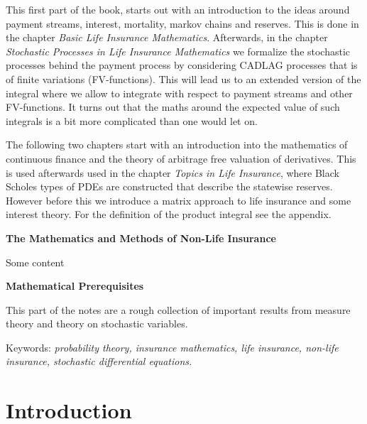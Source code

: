 \documentclass[a4paper,12pt,openany]{book}
\begin{document}
This first part of the book, starts out with an introduction to the ideas around payment streams, interest, mortality, markov chains and reserves. This is done in the chapter \emph{Basic Life Insurance Mathematics}. Afterwards, in the chapter \emph{Stochastic Processes in Life Insurance Mathematics} we formalize the stochastic processes behind the payment process by considering CADLAG processes that is of finite variations (FV-functions). This will lead us to an extended version of the integral where we allow to integrate with respect to payment streams and other FV-functions. It turns out that the maths around the expected value of such integrals is a bit more complicated than one would let on.

The following two chapters start with an introduction into the mathematics of continuous finance and the theory of arbitrage free valuation of derivatives. This is used afterwards used in the chapter \emph{Topics in Life Insurance}, where Black Scholes types of PDEs are constructed that describe the statewise reserves. However before this we introduce a matrix approach to life insurance and some interest theory. For the definition of the product integral see the appendix.

\textbf{The Mathematics and Methods of Non-Life Insurance}

Some content

\textbf{Mathematical Prerequisites}

This part of the notes are a rough collection of important results from measure theory and theory on stochastic variables.

\vspace{5pt}
\noindent Keywords: \emph{probability theory, insurance mathematics, life insurance, non-life insurance, stochastic differential equations.}

\newpage

\begin{spacing}{1}
\tableofcontents
\end{spacing}

\newpage

\setcounter{page}{1}
\pagestyle{fancy}
\fancyhf{}
\renewcommand{\headrulewidth}{0pt}
\fancyhead[LE]{\fontsize{11}{12} \selectfont\nouppercase{\thepage}}
\fancyhead[RE]{\fontsize{11}{12} \selectfont\nouppercase{\leftmark}}
\fancyhead[LO]{\fontsize{11}{12} \selectfont\nouppercase{\rightmark}}
\fancyhead[RO]{\fontsize{11}{12} \selectfont\nouppercase{\thepage}}
\allowdisplaybreaks
\setlength{\abovedisplayskip}{10pt}
\setlength{\belowdisplayskip}{10pt}
\setlength{\abovedisplayshortskip}{-12pt}%
\setlength{\belowdisplayshortskip}{0pt}
\hypertarget{introduction}{%
\chapter*{Introduction}\label{introduction}}
\end{document}
